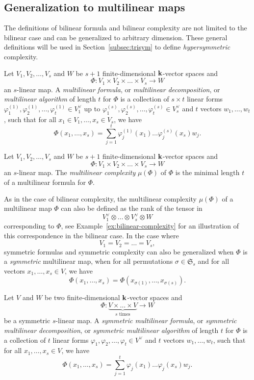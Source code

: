\subsection{Generalization to multilinear maps}
The definitions of bilinear formula and bilinear complexity are not limited to the
bilinear case and can be generalized to arbitrary dimension. These general
definitions will be used in Section~\ref{subsec:trisym} to define
\emph{hypersymmetric} complexity.
\begin{defi}
Let $V_1, V_2, \dots, V_s$ and $W$ be $s+1$ finite-dimensional $\mathbf{k}$-vector
spaces and
\[
  \Phi:V_1\times V_2\times\dots\times V_s\to W
\]
an $s$-linear map. A \emph{multilinear formula}, or \emph{multilinear
decomposition}, or \emph{multilinear algorithm} of length $t$ for $\Phi$ is a
collection of $s\times t$ linear forms $\varphi_1^{(1)}, \varphi_2^{(1)}, \dots,
\varphi_t^{(1)}\in V_1^\vee$ up to $\varphi_1^{(s)}, \varphi_2^{(s)}, \dots,
\varphi_t^{(s)}\in V_s^{\vee}$ and $t$ vectors $w_1, \dots, w_t$, such that for all $x_1\in V_1, \dots, x_s\in
V_s$, we have
\[
  \Phi(x_1, \dots, x_s) =
  \sum_{j=1}^t\varphi_j^{(1)}(x_1)\dots\varphi_j^{(s)}(x_s)w_j.
\]
\end{defi}
\begin{defi}
Let $V_1, V_2, \dots, V_s$ and $W$ be $s+1$ finite-dimensional $\mathbf{k}$-vector
spaces and
\[
  \Phi:V_1\times V_2\times\dots\times V_s\to W
\]
an $s$-linear map. The \emph{multilinear complexity} $\mu(\Phi)$ of $\Phi$ is the
minimal length $t$ of a multilinear formula for $\Phi$.
\end{defi}
As in the case of bilinear complexity, the multilinear complexity $\mu(\Phi)$ of a
multilinear map $\Phi$ can also be defined as the rank of the tensor in 
\[
  V_1^\vee\otimes\dots\otimes V_s^\vee\otimes W
\]
corresponding to $\Phi$, see Example~\ref{ex:bilinear-complexity} for an
illustration of this correspondence in the bilinear case. In the case where
\[
  V_1 = V_2 = \dots = V_s,
\]
symmetric formulas and
symmetric complexity can also be generalized when $\Phi$ is a \emph{symmetric}
multilinear map, \ie when for all permutations $\sigma\in\mathfrak S_s$ and for
all vectors $x_1, \dots, x_s\in V$, we have
\[
  \Phi(x_1, \dots, x_s) = \Phi(x_{\sigma(1)}, \dots, x_{\sigma(s)}).
\]
\begin{defi}
Let $V$ and $W$ be two finite-dimensional $\mathbf{k}$-vector
spaces and
\[
  \Phi:\underset{\textrm{$s$ times}}{\underbrace{V\times\dots\times V}}\to W
\]
be a symmetric $s$-linear map. A \emph{symmetric multilinear formula}, or
\emph{symmetric multilinear
decomposition}, or \emph{symmetric multilinear algorithm} of length $t$ for $\Phi$ is a
collection of $t$ linear forms $\varphi_1, \varphi_2, \dots,
\varphi_t\in V^\vee$ and $t$ vectors $w_1, \dots, w_t$, such that for all $x_1, \dots, x_s\in
V$, we have
\[
  \Phi(x_1, \dots, x_s) =
  \sum_{j=1}^t\varphi_j(x_1)\dots\varphi_j(x_s)w_j.
\]
\end{defi}
